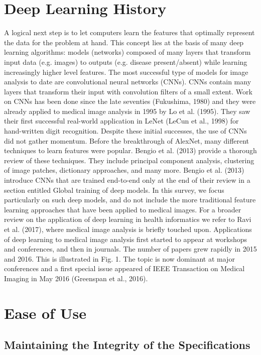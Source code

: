 \documentclass[conference]{IEEEtran}
\begin{document}
\section{Deep Learning History}
A logical next step is to let computers learn the features that optimally represent the data for the problem at hand. This concept lies at the basis of many deep learning algorithms: models (networks) composed of many layers that transform input data (e.g. images) to outputs (e.g. disease present/absent) while learning increasingly higher level features. The most successful type of models for image analysis to date are convolutional neural networks (CNNs). CNNs contain many layers that transform their input with convolution filters of a small extent. Work on CNNs has been done since the late seventies (Fukushima, 1980) and they were already applied to medical image analysis in 1995 by Lo et al. (1995). They saw their first successful real-world application in LeNet (LeCun et al., 1998) for hand-written digit recognition. Despite these initial successes, the use of CNNs did not gather momentum. Before the breakthrough of AlexNet, many different techniques to learn features were popular. Bengio et al. (2013) provide a thorough review of these techniques. They include principal component analysis, clustering of image patches, dictionary approaches, and many more. Bengio et al. (2013) introduce CNNs that are trained end-to-end only at the end of their review in a section entitled Global training of deep models. In this survey, we focus particularly on such deep models, and do not include the more traditional feature learning approaches that have been applied to medical images. For a broader review on the application of deep learning in health informatics we refer to Ravi et al. (2017), where medical image analysis is briefly touched upon. Applications of deep learning to medical image analysis first started to appear at workshops and conferences, and then in journals. The number of papers grew rapidly in 2015 and 2016. This is illustrated in Fig. 1. The topic is now dominant at major conferences and a first special issue appeared of IEEE Transaction on Medical Imaging in May 2016 (Greenspan et al., 2016).


\section{Ease of Use}

\subsection{Maintaining the Integrity of the Specifications}
\end{document}
